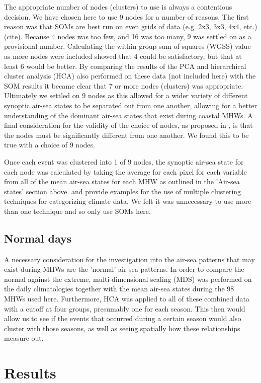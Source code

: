 \documentclass[a4paper,10pt,review]{elsarticle}
\begin{document}
The appropriate number of nodes (clusters) to use is always a contentious decision. We have chosen here to use 9 nodes for a number of reasons. The first reason was that SOMs are best run on even grids of data (e.g. 2x3, 3x3, 4x4, etc.) (cite). Because 4 nodes was too few, and 16 was too many, 9 was settled on as a provisional number. Calculating the within group sum of squares (WGSS) value as more nodes were included showed that 4 could be satisfactory, but that at least 6 would be better. By comparing the results of the PCA and hierarchical cluster analysis (HCA) also performed on these data (not included here) with the SOM results it became clear that 7 or more nodes (clusters) was appropriate. Ultimately we settled on 9 nodes as this allowed for a wider variety of different synoptic air-sea states to be separated out from one another, allowing for a better understanding of the dominant air-sea states that exist during coastal MHWs. A final consideration for the validity of the choice of nodes, as proposed in \citet{Johnson2013}, is that the nodes must be significantly different from one another. We found this to be true with a choice of 9 nodes.

Once each event was clustered into 1 of 9 nodes, the synoptic air-sea state for each node was calculated by taking the average for each pixel for each variable from all of the mean air-sea states for each MHW as outlined in the 'Air-sea states' section above. \citet{Ambroise2000} and \citet{Ramos2001} provide examples for the use of multiple clustering techniques for categorizing climate data. We felt it was unnecessary to use more than one technique and so only use SOMs here.

\subsection{Normal days}
A necessary consideration for the investigation into the air-sea patterns that may exist during MHWs are the 'normal' air-sea patterns. In order to compare the normal against the extreme, multi-dimensional scaling (MDS) was performed on the daily climatologies together with the mean air-sea states during the 98 MHWs used here. Furthermore, HCA was applied to all of these combined data with a cutoff at four groups, presumably one for each season. This then would allow us to see if the events that occurred during a certain season would also cluster with those seasons, as well as seeing spatially how these relationships measure out.

\section{Results}
\end{document}
